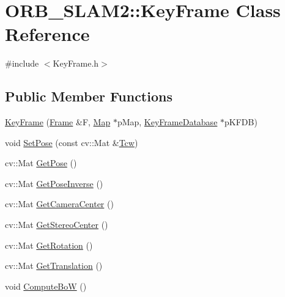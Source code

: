 \hypertarget{class_o_r_b___s_l_a_m2_1_1_key_frame}{}\section{O\+R\+B\+\_\+\+S\+L\+A\+M2\+:\+:Key\+Frame Class Reference}
\label{class_o_r_b___s_l_a_m2_1_1_key_frame}


{\ttfamily \#include $<$Key\+Frame.\+h$>$}

\subsection*{Public Member Functions}
\begin{DoxyCompactItemize}
\item 
\mbox{\hyperlink{class_o_r_b___s_l_a_m2_1_1_key_frame_a6b2fd06ed5e4a8f9546c515db554bcb6}{Key\+Frame}} (\mbox{\hyperlink{class_o_r_b___s_l_a_m2_1_1_frame}{Frame}} \&F, \mbox{\hyperlink{class_o_r_b___s_l_a_m2_1_1_map}{Map}} $\ast$p\+Map, \mbox{\hyperlink{class_o_r_b___s_l_a_m2_1_1_key_frame_database}{Key\+Frame\+Database}} $\ast$p\+K\+F\+DB)
\item 
void \mbox{\hyperlink{class_o_r_b___s_l_a_m2_1_1_key_frame_aa799150fa33f3b9a404226454b96c95a}{Set\+Pose}} (const cv\+::\+Mat \&\mbox{\hyperlink{class_o_r_b___s_l_a_m2_1_1_key_frame_a8dc31ef9a08d34ecb196f3e58a2c09b9}{Tcw}})
\item 
cv\+::\+Mat \mbox{\hyperlink{class_o_r_b___s_l_a_m2_1_1_key_frame_a49b5e212c1335cf585eaf6bbc4fed85c}{Get\+Pose}} ()
\item 
cv\+::\+Mat \mbox{\hyperlink{class_o_r_b___s_l_a_m2_1_1_key_frame_a03be061f5dac65d360d65c6e8a63532f}{Get\+Pose\+Inverse}} ()
\item 
cv\+::\+Mat \mbox{\hyperlink{class_o_r_b___s_l_a_m2_1_1_key_frame_a535f0f7db34aca7c55ddadc2ad9f4a5f}{Get\+Camera\+Center}} ()
\item 
cv\+::\+Mat \mbox{\hyperlink{class_o_r_b___s_l_a_m2_1_1_key_frame_aac7e26797d9b3e7ef4acd656056ff4ce}{Get\+Stereo\+Center}} ()
\item 
cv\+::\+Mat \mbox{\hyperlink{class_o_r_b___s_l_a_m2_1_1_key_frame_a43cdfc1cebc87d949ae6e9a0202b0f1b}{Get\+Rotation}} ()
\item 
cv\+::\+Mat \mbox{\hyperlink{class_o_r_b___s_l_a_m2_1_1_key_frame_a6f1426dc5447170df37c31db40edef14}{Get\+Translation}} ()
\item 
void \mbox{\hyperlink{class_o_r_b___s_l_a_m2_1_1_key_frame_ac376017c23823c05a6bb851ffb2fdd8f}{Compute\+BoW}} ()

\end{DoxyCompactItemize}
